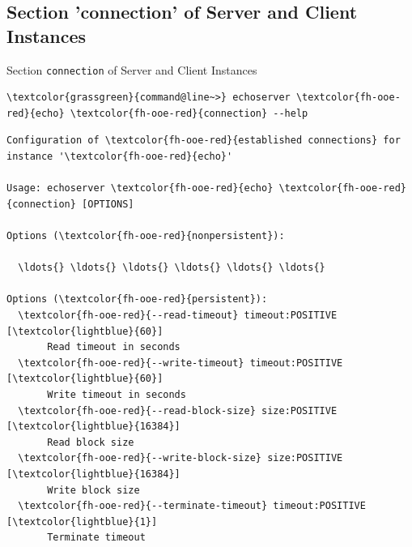 \subsection{Section 'connection' of Server and Client Instances}

\begin{frame}[fragile]{Section \alert{\lstinline|connection|} of Server and Client Instances}
\begin{scriptsize}
\begin{Verbatim}[commandchars=\\\{\}]
\textcolor{grassgreen}{command@line~>} echoserver \textcolor{fh-ooe-red}{echo} \textcolor{fh-ooe-red}{connection} --help
\end{Verbatim}
\begin{Verbatim}[commandchars=\\\{\},frame=leftline]
Configuration of \textcolor{fh-ooe-red}{established connections} for instance '\textcolor{fh-ooe-red}{echo}'

Usage: echoserver \textcolor{fh-ooe-red}{echo} \textcolor{fh-ooe-red}{connection} [OPTIONS]

Options (\textcolor{fh-ooe-red}{nonpersistent}):

  \ldots{} \ldots{} \ldots{} \ldots{} \ldots{} \ldots{}

Options (\textcolor{fh-ooe-red}{persistent}):
  \textcolor{fh-ooe-red}{--read-timeout} timeout:POSITIVE [\textcolor{lightblue}{60}]
       Read timeout in seconds
  \textcolor{fh-ooe-red}{--write-timeout} timeout:POSITIVE [\textcolor{lightblue}{60}]
       Write timeout in seconds
  \textcolor{fh-ooe-red}{--read-block-size} size:POSITIVE [\textcolor{lightblue}{16384}]
       Read block size
  \textcolor{fh-ooe-red}{--write-block-size} size:POSITIVE [\textcolor{lightblue}{16384}]
       Write block size
  \textcolor{fh-ooe-red}{--terminate-timeout} timeout:POSITIVE [\textcolor{lightblue}{1}]
       Terminate timeout

\end{Verbatim}
\end{scriptsize}
\end{frame}
